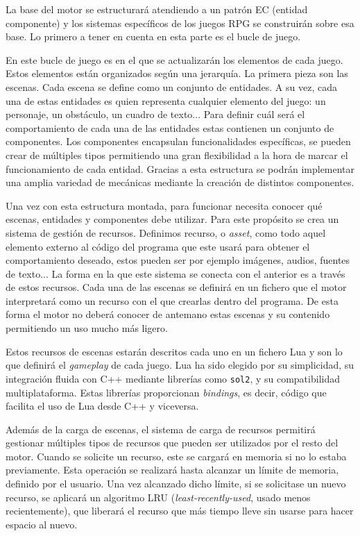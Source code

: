 La base del motor se estructurará atendiendo a un patrón EC (entidad componente) y los sistemas específicos de los juegos RPG se construirán sobre esa base. Lo primero a tener en cuenta en esta parte es el bucle de juego.

\medskip  

En este bucle de juego es en el que se actualizarán los elementos de cada juego. Estos elementos están organizados según una jerarquía. La primera pieza son las escenas. Cada escena se define como un conjunto de entidades. A su vez, cada una de estas entidades es quien representa cualquier elemento del juego: un personaje, un obstáculo, un cuadro de texto... Para definir cuál será el comportamiento de cada una de las entidades estas contienen un conjunto de componentes. Los componentes encapsulan funcionalidades específicas, se pueden crear de múltiples tipos permitiendo una gran flexibilidad a la hora de marcar el funcionamiento de cada entidad. Gracias a esta estructura se podrán implementar una amplia variedad de mecánicas mediante la creación de distintos componentes.  

\medskip

Una vez con esta estructura montada, para funcionar necesita conocer qué escenas, entidades y componentes debe utilizar. Para este propósito se crea un sistema de gestión de recursos. Definimos recurso, o \textit{asset}, como todo aquel elemento externo al código del programa que este usará para obtener el comportamiento deseado, estos pueden ser por ejemplo imágenes, audios, fuentes de texto... La forma en la que este sistema se conecta con el anterior es a través de estos recursos. Cada una de las escenas se definirá en un fichero que el motor interpretará como un recurso con el que crearlas dentro del programa. De esta forma el motor no deberá conocer de antemano estas escenas y su contenido permitiendo un uso mucho más ligero.

\smallskip

Estos recursos de escenas estarán descritos cada uno en un fichero Lua y son lo que definirá el \textit{gameplay} de cada juego. Lua ha sido elegido por su simplicidad, su integración fluida con C++ mediante librerías como \texttt{sol2}, y su compatibilidad multiplataforma. Estas librerías proporcionan \textit{bindings}, es decir, código que facilita el uso de Lua desde C++ y viceversa.

\medskip

Además de la carga de escenas, el sistema de carga de recursos permitirá gestionar múltiples tipos de recursos que pueden ser utilizados por el resto del motor. Cuando se solicite un recurso, este se cargará en memoria si no lo estaba previamente. Esta operación se realizará hasta alcanzar un límite de memoria, definido por el usuario. Una vez alcanzado dicho límite, si se solicitase un nuevo recurso, se aplicará un algoritmo LRU (\textit{least-recently-used}, usado menos recientemente), que liberará el recurso que más tiempo lleve sin usarse para hacer espacio al nuevo.

